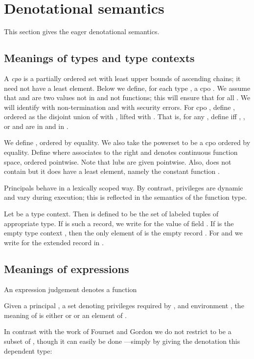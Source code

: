 \documentclass[submission,copyright,creativecommons]{eptcs}
\begin{document}
\section{Denotational semantics}
\label{sec:ds}


This section gives the eager denotational semantics. 

\subsection{Meanings of types and type contexts}

A \emph{cpo} is a partially ordered set with least upper bounds of
ascending chains; it need not have a least element. 
Below we define, for each type , a cpo .
We assume that  and  are two values not in 
 and not functions; this will ensure that 
 for all . We will identify
 with non-termination and  with security errors.
For cpo , define ,  
ordered as the disjoint union of  with , lifted with .  
That is, for any , define
 iff , , or  and  are in  and  in .

We define ,
ordered by equality. We also take the powerset  to be a cpo ordered by 
equality.  
Define  where  associates to the right and 
denotes continuous function space, ordered pointwise.  Note that lubs are 
given pointwise. Also,  does not contain  but it 
does have a least element, namely the constant function 
.

Principals behave in a lexically scoped way.  By contrast, privileges are
dynamic and vary during execution; this is reflected in the semantics of the function
type.  

Let  be a type context. Then
 is defined to be the set
 of labeled tuples of
appropriate type.  If  is such a record, we write  for the
value of field .  If  is the empty type context ,
then the only element of  is the empty record .  For
 and  we write  for the
extended record in .

\subsection{Meanings of expressions}\label{sec:mexpr}

An expression judgement denotes a function

Given a principal , a set  denoting privileges required
by , and environment , the meaning of 
is either  or  or an element of .

In contrast with the work of Fournet and Gordon we do not restrict  to be a subset of ,
though it can easily be done ---simply by giving the denotation this dependent type:
\end{document}
